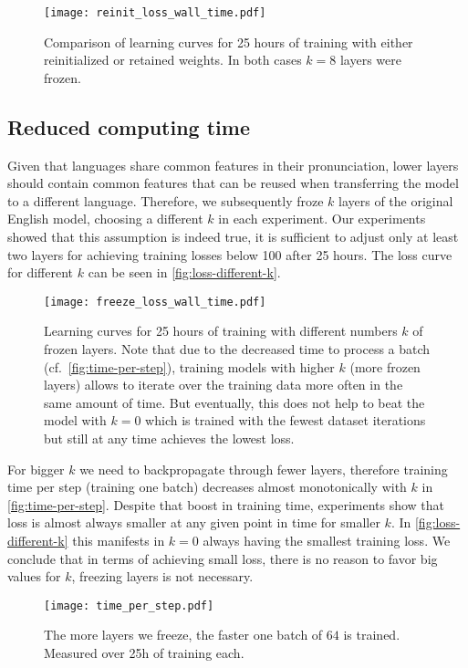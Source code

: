 \documentclass[11pt,a4paper]{article}
\begin{document}
\begin{figure}[th]
  \texttt{[image: reinit\_loss\_wall\_time.pdf]}
  \caption{Comparison of learning curves for 25 hours of training with either reinitialized or retained weights. In both cases $k = 8$ layers were frozen.
  }
  \label{fig:convergence-reinit}
\end{figure}

\subsection{Reduced computing time}

Given that languages share common features in their pronunciation,
lower layers should contain common features that can be reused when transferring the model to a different language.
Therefore, we subsequently froze $k$ layers of the original English model,
choosing a different $k$ in each experiment.
Our experiments showed that this assumption is indeed true,
it is sufficient to adjust only at least two layers for achieving training losses below 100 after 25 hours.
The loss curve for different $k$ can be seen in \autoref{fig:loss-different-k}.

\begin{figure}[th]
  \texttt{[image: freeze\_loss\_wall\_time.pdf]}
  \caption{Learning curves for 25 hours of training with different numbers $k$ of frozen layers.
Note that due to the decreased time to process a batch (cf.~\autoref{fig:time-per-step}),
training models with higher $k$ (more frozen layers) allows to iterate over the training data more often in the same amount of time.
But eventually, this does not help to beat the model with $k=0$ which is trained with the fewest dataset iterations but still at any time achieves the lowest loss.
  }
  \label{fig:loss-different-k}
\end{figure}

For bigger $k$ we need to backpropagate through fewer layers, therefore training time per step (training one batch) decreases almost monotonically with $k$ in \autoref{fig:time-per-step}.
Despite that boost in training time, experiments show that loss is almost always smaller at any given point in time for smaller $k$.
In \autoref{fig:loss-different-k} this manifests in $k = 0$ always having the smallest training loss.
We conclude that in terms of achieving small loss, there is no reason to favor big values for $k$, freezing layers is not necessary.

\begin{figure}[th]
  \texttt{[image: time\_per\_step.pdf]}
  \caption{The more layers we freeze, the faster one batch of $64$ is trained. Measured over 25h of training each.}
  \label{fig:time-per-step}
\end{figure}
\end{document}

